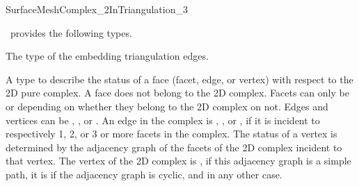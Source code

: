\begin{ccRefConcept}{SurfaceMeshComplex_2InTriangulation_3}


\ccTypes
\ccRefName\ provides the following types.

\ccGlue
{}
\ccGlue
{}
\ccGlue
{}
\ccGlue
{} {The  type of
the  embedding triangulation edges.}


{A type to describe the status of a face (facet, edge, or vertex) with respect to 
the 2D pure complex. A  face does not belong to the 2D complex.
Facets can only be    or 
depending on whether they belong to the 2D complex on not.
Edges and vertices can be  , ,
 or .
An edge in the complex is 
,
, or ,
 if it is incident to respectively 1, 2,  or 3 or
more facets in the complex.
The status of a vertex is determined by 
the adjacency graph of the facets of the 2D complex
incident to that vertex.
The vertex  of the 2D complex is , if this adjacency graph
is a simple path,  it is  if the adjacency graph is cyclic,
and in any other case.
}


\ccGlue
{}
\ccGlue
{}




\ccCreation
{}  %


\end{ccRefConcept}
